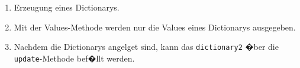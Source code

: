 \begin{enumerate}
\item Erzeugung eines Dictionarys. 


\item Mit der Values-Methode werden nur die Values eines Dictionarys ausgegeben. 


\item Nachdem die Dictionarys angelget sind, kann das \lstinline$dictionary2$ �ber die \lstinline$update$-Methode bef�llt werden.

\end{enumerate}

